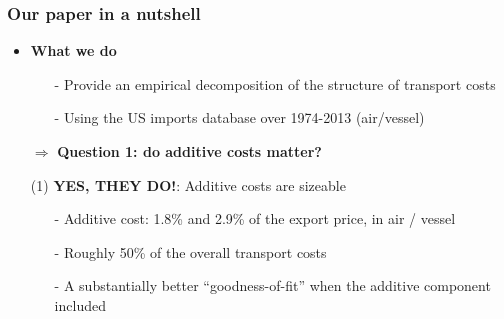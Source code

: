 \documentclass[10 pt,Helvetica, french]{beamer}
\begin{document}
\begin{frame}
\frametitle{Our paper in a nutshell}

\begin{itemize}
\item  \textbf{What we do} \vspace{0.1cm}
\begin{itemize}
\item[-] Provide an empirical decomposition of the structure of transport costs \vspace{0.1cm}
\item[-] Using the US imports database over 1974-2013 (air/vessel)\vspace{0.2cm}
\end{itemize}
\item[$\Rightarrow$] \textbf{Question 1: do additive costs matter?} \vspace{0.1cm}

\pause

\item[(1)] \textbf{YES, THEY DO!}: Additive costs are sizeable \vspace{0.1cm}
\begin{itemize}
\item[-] Additive cost: 1.8\% and 2.9\% of the export price, in air / vessel \vspace{0.1cm}
\item[-] Roughly 50\% of the overall transport costs \vspace{0.1cm}
\item[-] A substantially better ``goodness-of-fit'' when the additive component included
\end{itemize}
\end{itemize}
\end{frame}
\end{document}
